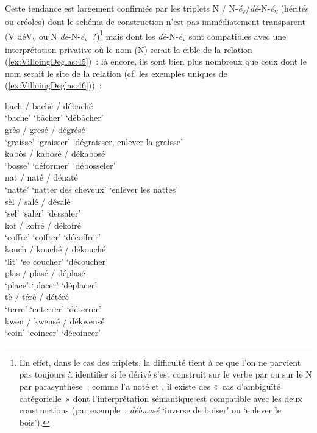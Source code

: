\documentclass[output=paper]{langsci/langscibook}
\begin{document}
Cette tendance est largement confirmée par les triplets N /
N-\emph{é}\textsubscript{\textsc{v}}/\emph{dé}-N-\emph{é}\textsubscript{\textsc{v}} (hérités ou créoles) dont
le schéma de construction n'est pas immédiatement transparent (V \textrightarrow{~}
déV\textsubscript{\textsc{v}} ou N \textrightarrow{~}\emph{dé}-N-\emph{é}\textsubscript{\textsc{v}}~?)\footnote{En effet, dans le
  cas des triplets, la difficulté tient à ce que l'on ne parvient pas
  toujours à identifier si le dérivé s'est construit sur le verbe par
   ou sur le N par parasynthèse~; comme l'a noté %
\citet[63]{Corbin87} %
%
 et %
\citet[12]{Amiot08}%
%
, il existe des «~cas d'ambiguïté
  catégorielle~» dont l'interprétation sémantique est compatible avec
  les deux constructions (par exemple~: \emph{débwasé} `inverse de
  boiser' ou `enlever le bois').} mais dont les \emph{dé}-N-\emph{é}\textsubscript{\textsc{v}}
sont compatibles avec une interprétation privative où le nom (N) serait
la cible de la relation (\ref{ex:VilloingDeglas:45})~: là encore, ils sont bien plus
nombreux que ceux dont le nom serait le site de la relation (cf. les
exemples uniques de (\ref{ex:VilloingDeglas:46}))~:

\ea \label{ex:VilloingDeglas:45}
      \ea \gll bach / baché / débaché \\
        {`bache'} {} {`bâcher'} {} {`débâcher'}\\
      \ex \gll  grès / gresé / dégrésé \\
        {`graisse'} {} {`graisser'} {} {`dégraisser, enlever la graisse'}\\
      \ex \gll  kabòs / kabosé / dékabosé \\
        {`bosse'} {} {`déformer'} {} {`débosseler'}\\
      \ex \gll  nat / naté / dénaté \\
        {`natte'} {} {`natter des cheveux'} {} {`enlever les nattes'}\\
      \ex \gll  sèl / salé / désalé \\
        {`sel'} {} {`saler'} {} {`dessaler'}\\
      \z
\ex \label{ex:VilloingDeglas:46}
      \ea \gll kof / kofré / dékofré \\
        {`coffre'} {} {`coffrer'} {} {`décoffrer'}\\
      \ex \gll  kouch / kouché / dékouché \\
        {`lit'} {} {`se coucher'} {} {`découcher'}\\
      \ex \gll  plas / plasé / déplasé \\
        {`place'} {} {`placer'} {} {`déplacer'}\\
      \ex \gll  tè / téré / détéré \\
        {`terre'} {} {`enterrer'} {} {`déterrer'}\\
      \ex \gll  kwen / kwensé / dékwensé \\
        {`coin'} {} {`coincer'} {} {`décoincer'}\\
\z\z
\end{document}
